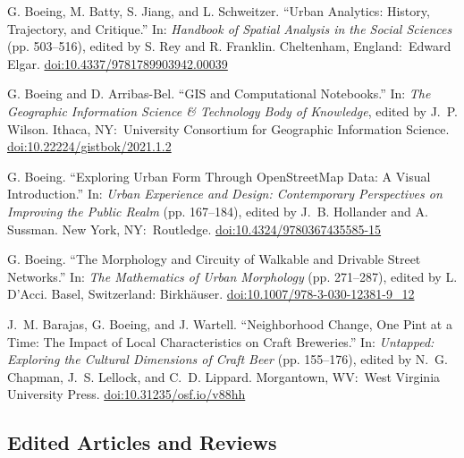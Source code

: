     \begin{tablist}

        \item[2022] \tab{}G. Boeing, M. Batty, S. Jiang, and L. Schweitzer. \enquote{Urban Analytics: History, Trajectory, and Critique.} In: \textit{Handbook of Spatial Analysis in the Social Sciences} (pp. 503--516), edited by S. Rey and R. Franklin. Cheltenham, England:\ Edward Elgar. \href{https://doi.org/10.4337/9781789903942.00039}{doi:10.4337/9781789903942.00039}

        \item[2021] \tab{}G. Boeing and D. Arribas-Bel. \enquote{GIS and Computational Notebooks.} In: \textit{The Geographic Information Science \& Technology Body of Knowledge}, edited by J.~P. Wilson. Ithaca, NY:\ University Consortium for Geographic Information Science. \href{https://doi.org/10.22224/gistbok/2021.1.2}{doi:10.22224/gistbok/2021.1.2}

        \item[2021] \tab{}G. Boeing. \enquote{Exploring Urban Form Through OpenStreetMap Data: A Visual Introduction.} In: \textit{Urban Experience and Design: Contemporary Perspectives on Improving the Public Realm} (pp. 167--184), edited by J.~B. Hollander and A. Sussman. New York, NY:\ Routledge. \href{https://doi.org/10.4324/9780367435585-15}{doi:10.4324/9780367435585-15}

        \item[2019] \tab{}G. Boeing. \enquote{The Morphology and Circuity of Walkable and Drivable Street Networks.} In: \textit{The Mathematics of Urban Morphology} (pp. 271--287), edited by L. D'Acci. Basel, Switzerland: Birkh{\"a}user. \href{https://doi.org/10.1007/978-3-030-12381-9_12}{doi:10.1007/978-3-030-12381-9\_12}

        \item[2017] \tab{}J.~M. Barajas, G. Boeing, and J. Wartell. \enquote{Neighborhood Change, One Pint at a Time: The Impact of Local Characteristics on Craft Breweries.} In: \textit{Untapped: Exploring the Cultural Dimensions of Craft Beer} (pp. 155--176), edited by N.~G. Chapman, J.~S. Lellock, and C.~D. Lippard. Morgantown, WV:\ West Virginia University Press. \href{https://doi.org/10.31235/osf.io/v88hh}{doi:10.31235/osf.io/v88hh}

    \end{tablist}

    \subsection*{Edited Articles and Reviews}

